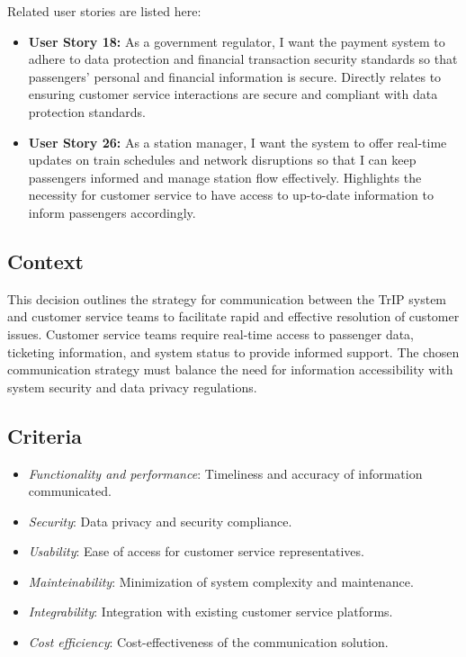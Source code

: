 Related user stories are listed here:
\begin{itemize}
    \item \textbf{User Story 18:} As a government regulator, I want the payment system to adhere to data protection and financial transaction security standards so that passengers' personal and financial information is secure. Directly relates to ensuring customer service interactions are secure and compliant with data protection standards.
    \item \textbf{User Story 26:} As a station manager, I want the system to offer real-time updates on train schedules and network disruptions so that I can keep passengers informed and manage station flow effectively. Highlights the necessity for customer service to have access to up-to-date information to inform passengers accordingly.
\end{itemize}

\subsection*{Context}
This decision outlines the strategy for communication between the TrIP system and customer service teams to facilitate rapid and effective resolution of customer issues. Customer service teams require real-time access to passenger data, ticketing information, and system status to provide informed support. The chosen communication strategy must balance the need for information accessibility with system security and data privacy regulations.

\subsection*{Criteria}
\begin{itemize}
    \item \textit{Functionality and performance}: Timeliness and accuracy of information communicated.
    \item \textit{Security}: Data privacy and security compliance.
    \item \textit{Usability}: Ease of access for customer service representatives.
    \item \textit{Mainteinability}: Minimization of system complexity and maintenance.
    \item \textit{Integrability}: Integration with existing customer service platforms.
    \item \textit{Cost efficiency}: Cost-effectiveness of the communication solution.
\end{itemize}

